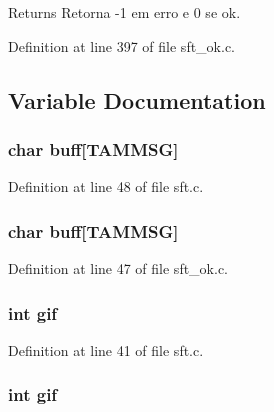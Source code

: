 \begin{DoxyReturn}{Returns}
Retorna -\/1 em erro e 0 se ok. 
\end{DoxyReturn}


Definition at line 397 of file sft\_\-ok.c.



\subsection{Variable Documentation}
\hypertarget{group__tools_gadab5417956854dcc8d2283b3d89c39de}{
\subsubsection[{buff}]{\setlength{\rightskip}{0pt plus 5cm}char {\bf buff}\mbox{[}TAMMSG\mbox{]}}}
\label{group__tools_gadab5417956854dcc8d2283b3d89c39de}


Definition at line 48 of file sft.c.

\hypertarget{group__tools_gadab5417956854dcc8d2283b3d89c39de}{
\subsubsection[{buff}]{\setlength{\rightskip}{0pt plus 5cm}char {\bf buff}\mbox{[}TAMMSG\mbox{]}}}
\label{group__tools_gadab5417956854dcc8d2283b3d89c39de}


Definition at line 47 of file sft\_\-ok.c.

\hypertarget{group__tools_ga80da5edc9ed66d0e87785ab0e5d3de73}{
\subsubsection[{gif}]{\setlength{\rightskip}{0pt plus 5cm}int {\bf gif}}}
\label{group__tools_ga80da5edc9ed66d0e87785ab0e5d3de73}


Definition at line 41 of file sft.c.

\hypertarget{group__tools_ga80da5edc9ed66d0e87785ab0e5d3de73}{
\subsubsection[{gif}]{\setlength{\rightskip}{0pt plus 5cm}int {\bf gif}}}
\label{group__tools_ga80da5edc9ed66d0e87785ab0e5d3de73}


